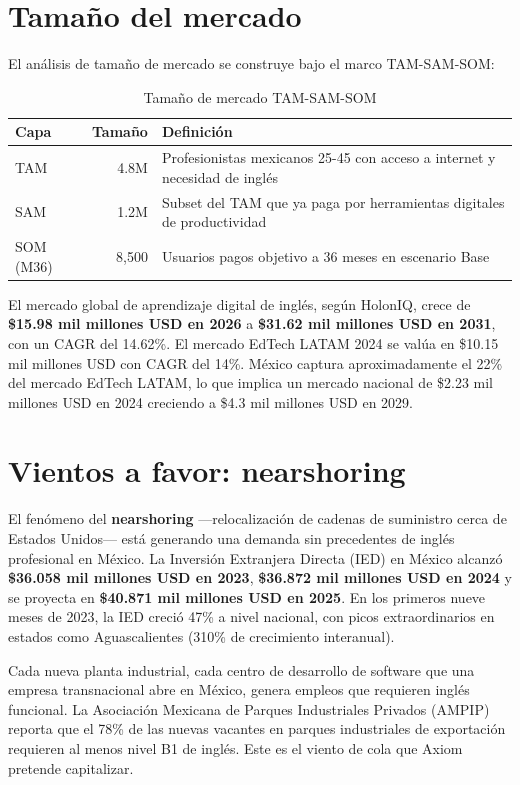 \documentclass[10pt,a4paper,oneside]{report}
\begin{document}
\section{Tamaño del mercado}
El análisis de tamaño de mercado se construye bajo el marco TAM-SAM-SOM:

\begin{table}[H]
\centering
\begin{tabular}{lrl}
\toprule
\textbf{Capa} & \textbf{Tamaño} & \textbf{Definición} \\
\midrule
TAM & 4.8M & Profesionistas mexicanos 25-45 con acceso a internet y necesidad de inglés \\
SAM & 1.2M & Subset del TAM que ya paga por herramientas digitales de productividad \\
SOM (M36) & 8,500 & Usuarios pagos objetivo a 36 meses en escenario Base \\
\bottomrule
\end{tabular}
\caption{Tamaño de mercado TAM-SAM-SOM}
\end{table}

El mercado global de aprendizaje digital de inglés, según HolonIQ, crece de \textbf{\$15.98 mil millones USD en 2026} a \textbf{\$31.62 mil millones USD en 2031}, con un CAGR del 14.62\%. El mercado EdTech LATAM 2024 se valúa en \$10.15 mil millones USD con CAGR del 14\%. México captura aproximadamente el 22\% del mercado EdTech LATAM, lo que implica un mercado nacional de \$2.23 mil millones USD en 2024 creciendo a \$4.3 mil millones USD en 2029.

\section{Vientos a favor: nearshoring}
El fenómeno del \textbf{nearshoring} —relocalización de cadenas de suministro cerca de Estados Unidos— está generando una demanda sin precedentes de inglés profesional en México. La Inversión Extranjera Directa (IED) en México alcanzó \textbf{\$36.058 mil millones USD en 2023}, \textbf{\$36.872 mil millones USD en 2024} y se proyecta en \textbf{\$40.871 mil millones USD en 2025}. En los primeros nueve meses de 2023, la IED creció 47\% a nivel nacional, con picos extraordinarios en estados como Aguascalientes (310\% de crecimiento interanual).

Cada nueva planta industrial, cada centro de desarrollo de software que una empresa transnacional abre en México, genera empleos que requieren inglés funcional. La Asociación Mexicana de Parques Industriales Privados (AMPIP) reporta que el 78\% de las nuevas vacantes en parques industriales de exportación requieren al menos nivel B1 de inglés. Este es el viento de cola que Axiom pretende capitalizar.
\end{document}
